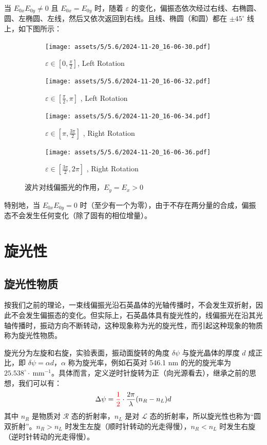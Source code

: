 \documentclass[UTF8]{report}
\theoremstyle{MyLineTheoremStyle} %
\theoremstyle{MyBlockTheoremStyle} %
\theoremstyle{MySubsubsectionStyle} %
\begin{document}
当 $E_{0x}E_{0y} \ne 0$ 且 $E_{0x} = E_{0y}$ 时，随着 $\varepsilon$ 的变化，偏振态依次经过右线、右椭圆、圆、左椭圆、左线，然后又依次返回到右线。且线、椭圆（和圆）都在 $\pm 45^\circ$ 线上，如下图所示：

\begin{figure}[H]\centering
    \begin{subfigure}[b]{0.24\columnwidth}\centering
        \texttt{[image: assets/5/5.6/2024-11-20\_16-06-30.pdf]}
        \caption{$\varepsilon \in [0, \frac{\pi}{2}]$, Left Rotation}
    \end{subfigure}
    \begin{subfigure}[b]{0.24\columnwidth}\centering
        \texttt{[image: assets/5/5.6/2024-11-20\_16-06-32.pdf]}
        \caption{$\varepsilon \in [\frac{\pi}{2}, \pi]$ , Left Rotation}
    \end{subfigure}
    \begin{subfigure}[b]{0.24\columnwidth}\centering
        \texttt{[image: assets/5/5.6/2024-11-20\_16-06-34.pdf]}
        \caption{$\varepsilon \in [\pi, \frac{3\pi}{2}]$ , Right Rotation}
    \end{subfigure}
    \begin{subfigure}[b]{0.24\columnwidth}\centering
        \texttt{[image: assets/5/5.6/2024-11-20\_16-06-36.pdf]}
        \caption{$\varepsilon \in [\frac{3\pi}{2}, 2\pi]$ , Right Rotation}
    \end{subfigure}
    \caption{波片对线偏振光的作用，$E_y = E_x > 0$}
\end{figure}

特别地，当  $E_{0x}E_{0y} = 0$ 时（至少有一个为零），由于不存在两分量的合成，偏振态不会发生任何变化（除了固有的相位增量）。

\section{旋光性}
\subsection{旋光性物质}
按我们之前的理论，一束线偏振光沿石英晶体的光轴传播时，不会发生双折射，因此不会发生偏振态的变化。但实际上，石英晶体具有旋光性的，线偏振光在沿其光轴传播时，振动方向不断转动，这种现象称为光的旋光性，而引起这种现象的物质称为旋光性物质。

旋光分为左旋和右旋，实验表面，振动面旋转的角度 $\delta \psi$ 与旋光晶体的厚度 $d$ 成正比，即 $\delta \psi = \alpha d$，$\alpha$ 称为旋光率，例如石英对 546.1 nm 的光的旋光率为 $25.538^\circ \cdot \ \mathrm{mm^{-1}}$。具体而言，定义逆时针旋转为正（向光源看去），继承之前的思想，我们可以有：
\begin{equation}\label{旋光性}
\Delta \psi = {\color{red} \frac{1}{2}}\cdot  \frac{2\pi}{\lambda} (n_R - n_L) d
\end{equation}
其中 $n_R$ 是物质对 $\mathscr{R}$ 态的折射率，$n_L$ 是对 $\mathscr{L}$ 态的折射率，所以旋光性也称为“圆双折射”。$n_R >n_L$ 时发生左旋（顺时针转动的光走得慢），$n_R < n_L$ 时发生右旋（逆时针转动的光走得慢）。
\end{document}
